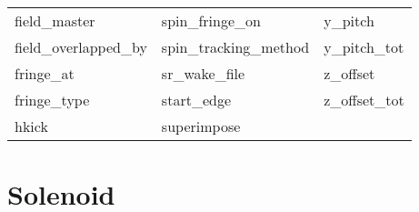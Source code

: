 \begin{tabular}{lll}
field_master                & spin_fringe_on              & y_pitch                     \\
field_overlapped_by         & spin_tracking_method        & y_pitch_tot                 \\
fringe_at                   & sr_wake_file                & z_offset                    \\
fringe_type                 & start_edge                  & z_offset_tot                \\
hkick                       & superimpose                 &                             \\
 \bottomrule
 \end{tabular}
 \vfill
 
 \section{Solenoid}
 \label{s:list.solenoid}
 

